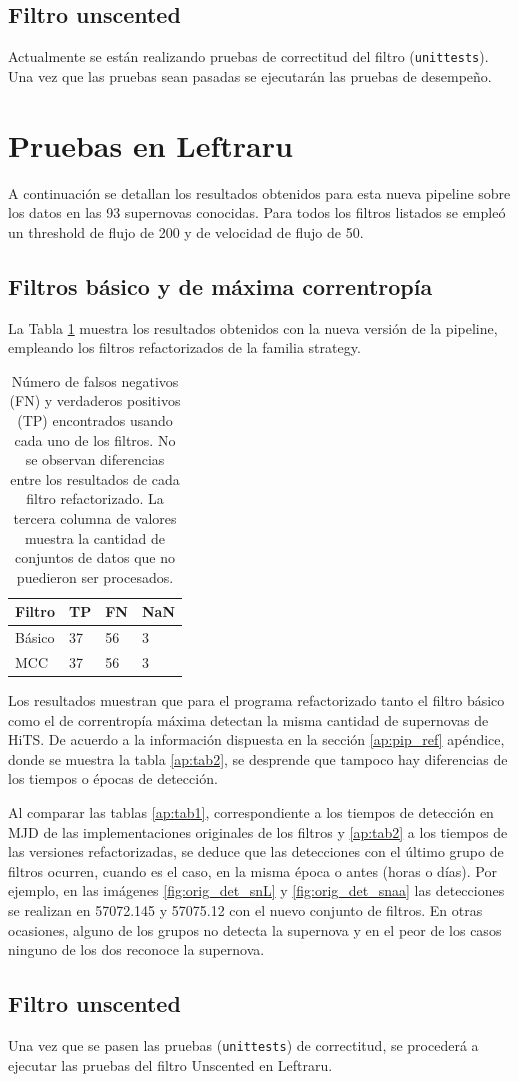 \subsection{Filtro unscented}
Actualmente se est\'an realizando pruebas de correctitud del filtro (\texttt{unittests}). Una vez que las pruebas sean pasadas se ejecutar\'an las pruebas de desempe\~no.
\section{Pruebas en Leftraru}
A continuaci\'on se detallan los resultados obtenidos para esta nueva pipeline sobre los datos en las 93 supernovas conocidas. Para todos los filtros listados se emple\'o un threshold de flujo de 200 y de velocidad de flujo de 50.
\subsection{Filtros b\'asico y de m\'axima correntrop\'ia}
La Tabla \ref{tab:tpfn_new} muestra los resultados obtenidos con la nueva versi\'on de la pipeline, empleando los filtros refactorizados de la familia strategy.
\begin{table}[h!]
\centering
\caption{N\'umero de falsos negativos (FN) y verdaderos positivos (TP) encontrados usando cada uno de los filtros. No se observan diferencias entre los resultados de cada filtro refactorizado. La tercera columna de valores muestra la cantidad de conjuntos de datos que no puedieron ser procesados.}
\begin{tabular}{|l|l|l|l|}
\hline
\textbf{Filtro} & \textbf{TP} & \textbf{FN} & \textbf{NaN}\\ \hline
Básico          & 37          & 56          &  3 \\ \hline
MCC             & 37          & 56          & 3 \\ \hline
\end{tabular}
\label{tab:tpfn_new}
\end{table}
\bigskip

Los resultados muestran que para el programa refactorizado tanto el filtro b\'asico como el de correntrop\'ia m\'axima detectan la misma cantidad de supernovas de HiTS. De acuerdo a la informaci\'on dispuesta en la secci\'on \ref{ap:pip_ref} ap\'endice, donde se muestra la tabla \ref{ap:tab2}, se desprende que tampoco hay diferencias de los tiempos o \'epocas de detecci\'on.
\bigskip

Al comparar las tablas \ref{ap:tab1}, correspondiente a los tiempos de detecci\'on en MJD de las implementaciones originales de los filtros y \ref{ap:tab2} a los tiempos de las versiones refactorizadas, se deduce que las detecciones con el \'ultimo grupo de filtros ocurren, cuando es el caso, en la misma \'epoca o antes (horas o d\'ias). Por ejemplo, en las im\'agenes \ref{fig:orig_det_snL} y  \ref{fig:orig_det_snaa} las detecciones se realizan en 57072.145 y 57075.12 con el nuevo conjunto de filtros.
En otras ocasiones, alguno de los grupos no detecta la supernova y en el peor de los casos ninguno de los dos reconoce la supernova.
\bigskip
  

\subsection{Filtro unscented}
Una vez que se pasen las pruebas (\texttt{unittests}) de correctitud, se proceder\'a a ejecutar las pruebas del filtro Unscented en Leftraru.